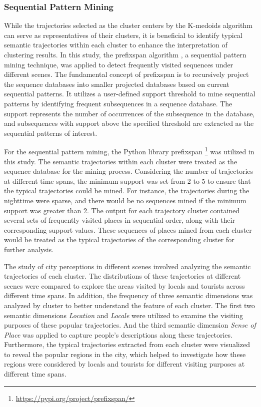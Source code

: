 \documentclass{article}
\theoremstyle{remark}
\begin{document}
\subsubsection{Sequential Pattern Mining}
While the trajectories selected as the cluster centers by the K-medoids algorithm can serve as representatives of their clusters, it is beneficial to identify typical semantic trajectories within each cluster to enhance the interpretation of clustering results. In this study, the \acrfull{prefixspan} algorithm \citep{pei_mining_2004}, a sequential pattern mining technique, was applied to detect frequently visited sequences under different scenes. The fundamental concept of \acrshort{prefixspan} is to recursively project the sequence databases into smaller projected databases based on current sequential patterns. It utilizes a user-defined support threshold to mine sequential patterns by identifying frequent subsequences in a sequence database. The support represents the number of occurrences of the subsequence in the database, and subsequences with support above the specified threshold are extracted as the sequential patterns of interest.

For the sequential pattern mining, the Python library prefixspan \footnote{\url{https://pypi.org/project/prefixspan/}} was utilized in this study. The semantic trajectories within each cluster were treated as the sequence database for the mining process. Considering the number of trajectories at different time spans, the minimum support was set from 2 to 5 to ensure that the typical trajectories could be mined. For instance, the trajectories during the nighttime were sparse, and there would be no sequences mined if the minimum support was greater than 2. The output for each trajectory cluster contained several sets of frequently visited places in sequential order, along with their corresponding support values. These sequences of places mined from each cluster would be treated as the typical trajectories of the corresponding cluster for further analysis.

The study of city perceptions in different scenes involved analyzing the semantic trajectories of each cluster. The distributions of these trajectories at different scenes were compared to explore the areas visited by locals and tourists across different time spans. In addition, the frequency of three semantic dimensions was analyzed by cluster to better understand the feature of each cluster. The first two semantic dimensions \textit{Location} and \textit{Locale} were utilized to examine the visiting purposes of these popular trajectories. And the third semantic dimension \textit{Sense of Place} was applied to capture people's descriptions along these trajectories. Furthermore, the typical trajectories extracted from each cluster were visualized to reveal the popular regions in the city, which helped to investigate how these regions were considered by locals and tourists for different visiting purposes at different time spans.
\end{document}

